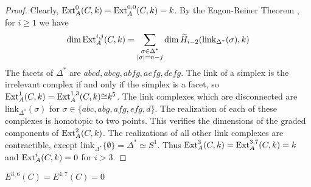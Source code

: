 \documentclass[11pt,righttag]{amsart}
\begin{document}
\begin{proof}
Clearly, ${\hbox{{\rm Ext}}}_A^0(C, k)={\hbox{{\rm Ext}}}_A^{0,0}(C,k)=k$. By the Eagon-Reiner Theorem \cite{ER}, for $i\ge 1$ we have
$$\dim {\hbox{{\rm Ext}}}_A^{i,j}(C,k) = \sum_{\substack{\sigma\in {\Delta}^*\\ |\sigma|=n-j\\ }} \dim \widetilde{H}_{i-2}({\text{link}}_{{\Delta}^*}(\sigma), k)$$
The facets of ${\Delta}^*$ are $abcd, abcg, abfg, aefg, defg$. The link of a simplex is the irrelevant complex if and only if the simplex is a facet, so ${\hbox{{\rm Ext}}}_A^1(C,k)={\hbox{{\rm Ext}}}_A^{1,3}(C,k){\cong} k^5$. The link complexes which are disconnected are ${\text{link}}_{{\Delta}^*}(\sigma)$ for $\sigma\in\{ abc, abg, afg, efg, d\}$. The realization of each of these complexes is homotopic to two points. This verifies the dimensions of the graded components of  ${\hbox{{\rm Ext}}}_A^2(C,k)$. The realizations of all other link complexes are contractible, except ${\text{link}}_{{\Delta}^*} \{\emptyset\}={\Delta}^*\simeq S^1$. Thus ${\hbox{{\rm Ext}}}_A^3(C,k)={\hbox{{\rm Ext}}}_A^{3,7}(C,k)=k$ and ${\hbox{{\rm Ext}}}_A^i(C,k)=0$ for $i>3$.

\end{proof}

\begin{lemma}
\label{vanish}
$E^{3,6}(C)=E^{4,7}(C)=0$
\end{lemma}
\end{document}
